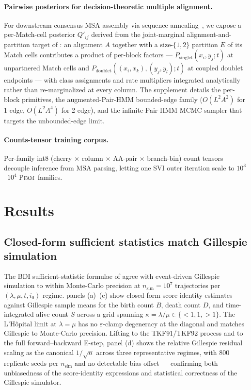 \documentclass[11pt]{article}
\theoremstyle{definition}
\theoremstyle{remark}
\newcommand{\Pfam}{\textsc{Pfam}}
\begin{document}
\paragraph{Pairwise posteriors for decision-theoretic multiple alignment.}
For downstream consensus-MSA assembly via
sequence annealing~\citep{BradleyEtAl2009}, we expose a per-Match-cell
posterior $Q'_{ij}$ derived from the joint-marginal alignment-and-partition
target of : an alignment $A$ together with a
size-$\{1, 2\}$ partition $E$ of its Match cells contributes a product
of per-block factors --- $P_{\mathrm{singlet}}(x_i, y_j; t)$ at
unpartnered Match cells and $P_{\mathrm{doublet}}((x_i, x_k), (y_j, y_l); t)$
at coupled doublet endpoints --- with class assignments and rate
multipliers integrated analytically rather than re-marginalized at
every column. The supplement details the per-block primitives, the
augmented-Pair-HMM bounded-edge family
($O(L^2 A^2)$ for 1-edge, $O(L^2 A^4)$ for 2-edge), and the
infinite-Pair-HMM MCMC sampler that targets the unbounded-edge limit.

\paragraph{Counts-tensor training corpus.}
Per-family int8 (cherry $\times$ column $\times$ AA-pair $\times$
branch-bin) count tensors decouple inference from MSA parsing,
letting one SVI outer iteration scale to $10^3$--$10^4$ \Pfam\
families.

\section{Results}
\label{sec:results}

\subsection{Closed-form sufficient statistics match Gillespie simulation}
\label{sec:results-bdi}

The BDI sufficient-statistic formulae of  agree
with event-driven Gillespie simulation to within Monte-Carlo
precision at $n_{\mathrm{sim}} = 10^7$ trajectories per
$(\lambda, \mu, t, i_0)$ regime. 
panels (a)--(c) show closed-form score-identity estimates against
Gillespie sample means for the birth count $B$, death count $D$,
and time-integrated alive count $S$ across a grid spanning
$\kappa = \lambda / \mu \in \{<1, 1, >1\}$. The
L'H\^opital limit at $\lambda = \mu$ has no $\varepsilon$-clamp
degeneracy at the diagonal and matches Gillespie to Monte-Carlo
precision. Lifting to the TKF91/TKF92 process and to the full
forward--backward E-step, panel (d) shows the relative Gillespie
residual scaling as the canonical $1/\sqrt{n}$ across three
representative regimes, with 800 replicate seeds per
$n_{\mathrm{sim}}$ and no detectable bias offset --- confirming both
unbiasedness of the score-identity expressions and statistical
correctness of the Gillespie simulator.
\end{document}
